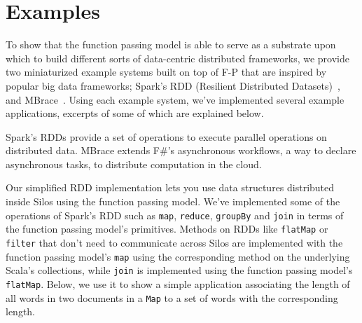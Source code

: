 \documentclass[10pt]{sigplanconf}
\theoremstyle{definition}
\theoremstyle{definition}
\begin{document}
%
%

\section{Examples}
\label{sec:examples}

To show that the function passing model is able to serve as a substrate upon
which to build different sorts of data-centric distributed frameworks, we
provide two miniaturized example systems built on top of F-P that are inspired
by popular big data frameworks; Spark's RDD (Resilient Distributed
Datasets)~\cite{Spark}, and MBrace~\cite{MBrace}. Using each example system,
we've implemented several example applications, excerpts of some of which are
explained below.

Spark's RDDs provide a set of operations to execute parallel operations on
distributed data. MBrace extends F\#’s asynchronous workflows, a way to declare
asynchronous tasks, to distribute computation in the cloud.

Our simplified RDD implementation lets you use data structures distributed
inside Silos using the function passing model. We've implemented some of the
operations of Spark’s RDD such as \verb|map|, \verb|reduce|, \verb|groupBy| and
\verb|join| in terms of the function passing model's primitives. Methods on RDDs
like \verb|flatMap| or \verb|filter| that don’t need to communicate across Silos
are implemented with the function passing model’s \verb|map| using the
corresponding method on the underlying Scala’s collections, while \verb|join| is
implemented using the function passing model’s \verb|flatMap|. Below, we use it
to show a simple application associating the length of all words in two
documents in a \verb|Map| to a set of words with the corresponding length.
\end{document}
